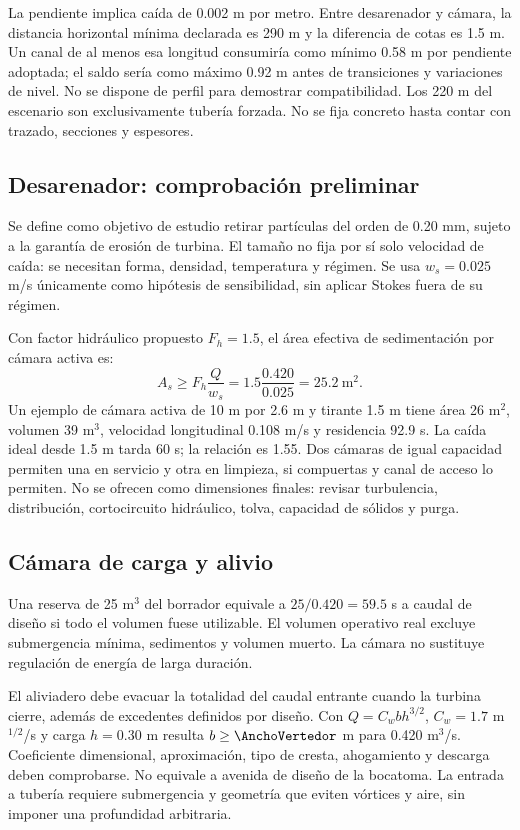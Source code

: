 La pendiente implica caída de 0.002 m por metro. Entre desarenador y cámara, la distancia horizontal mínima declarada es 290 m y la diferencia de cotas es 1.5 m. Un canal de al menos esa longitud consumiría como mínimo 0.58 m por pendiente adoptada; el saldo sería como máximo 0.92 m antes de transiciones y variaciones de nivel. No se dispone de perfil para demostrar compatibilidad. Los 220 m del escenario son exclusivamente tubería forzada. No se fija concreto hasta contar con trazado, secciones y espesores.

\subsection{Desarenador: comprobación preliminar}
Se define como objetivo de estudio retirar partículas del orden de 0.20 mm, sujeto a la garantía de erosión de turbina. El tamaño no fija por sí solo velocidad de caída: se necesitan forma, densidad, temperatura y régimen. Se usa $w_s=0.025$ m/s únicamente como hipótesis de sensibilidad, sin aplicar Stokes fuera de su régimen.

Con factor hidráulico propuesto $F_h=1.5$, el área efectiva de sedimentación por cámara activa es:
\[
A_s\geq F_h\frac{Q}{w_s}=1.5\frac{0.420}{0.025}=25.2\ \mathrm{m^2}.
\]
Un ejemplo de cámara activa de 10 m por 2.6 m y tirante 1.5 m tiene área 26 m$^2$, volumen 39 m$^3$, velocidad longitudinal 0.108 m/s y residencia 92.9 s. La caída ideal desde 1.5 m tarda 60 s; la relación es 1.55. Dos cámaras de igual capacidad permiten una en servicio y otra en limpieza, si compuertas y canal de acceso lo permiten. No se ofrecen como dimensiones finales: revisar turbulencia, distribución, cortocircuito hidráulico, tolva, capacidad de sólidos y purga.

\subsection{Cámara de carga y alivio}
Una reserva de 25 m$^3$ del borrador equivale a $25/0.420=59.5$ s a caudal de diseño si todo el volumen fuese utilizable. El volumen operativo real excluye submergencia mínima, sedimentos y volumen muerto. La cámara no sustituye regulación de energía de larga duración.

El aliviadero debe evacuar la totalidad del caudal entrante cuando la turbina cierre, además de excedentes definidos por diseño. Con $Q=C_wbh^{3/2}$, $C_w=1.7$ m$^{1/2}$/s y carga $h=0.30$ m resulta $b\geq\AnchoVertedor$ m para 0.420 m$^3$/s. Coeficiente dimensional, aproximación, tipo de cresta, ahogamiento y descarga deben comprobarse. No equivale a avenida de diseño de la bocatoma. La entrada a tubería requiere submergencia y geometría que eviten vórtices y aire, sin imponer una profundidad arbitraria.

